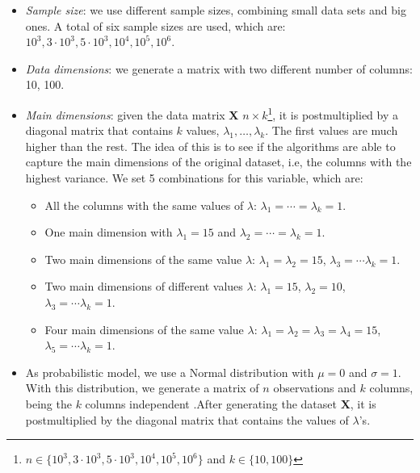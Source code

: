 \documentclass[11pt]{report}
\begin{document}
\begin{itemize}
\item \textit{Sample size}: we use different sample sizes, combining small
data sets and big ones. A total of six sample sizes are used, which are:
$10^3, 3\cdot 10^3, 5\cdot10^3, 10^4, 10^5, 10^6$.

\item \textit{Data dimensions}: we generate a matrix with two different number 
of columns: 10, 100.

\item \textit{Main dimensions}: given the data matrix \textbf{X} $n \times k$\footnote{$n \in \{10^3, 3\cdot 10^3, 5\cdot10^3, 10^4, 10^5, 10^6 \}$ and $k \in \{10, 100\}$},
it is postmultiplied by a diagonal matrix that contains $k$ values, 
$\lambda_1, \dots, \lambda_k$. The first values are much higher than the rest.
The idea of this is to see if the algorithms are able to capture the main
dimensions of the original dataset, i.e, the columns  with the highest variance. 
We set 5 combinations for this variable, which are:

\begin{itemize}
\item All the columns with the same values of $\lambda$: 
$\lambda_1 = \cdots = \lambda_k = 1$.

\item One main dimension with $\lambda_1 = 15$ and 
$\lambda_2 = \cdots = \lambda_k = 1$.

\item  Two main dimensions of the same value $\lambda$: 
$\lambda_1  = \lambda_2 = 15$, $\lambda_3 = \cdots \lambda_k = 1$.

\item  Two main dimensions of different values $\lambda$: 
$\lambda_1  = 15$, $\lambda_2 =10$, $\lambda_3 = \cdots \lambda_k = 1$.

\item  Four main dimensions of the same value $\lambda$: 
$\lambda_1  = \lambda_2 = \lambda_3 = \lambda_4 = 15$, $\lambda_5 = \cdots \lambda_k = 1$.


\end{itemize}

\item As probabilistic model, we use a Normal distribution with $\mu = 0$ and 
$\sigma = 1$. With this distribution, we generate a matrix of $n$ observations
and $k$ columns, being the $k$ columns independent .After generating the 
dataset \textbf{X}, it is postmultiplied by the diagonal matrix that contains
the values of $\lambda$'s.


\end{itemize}
\end{document}
